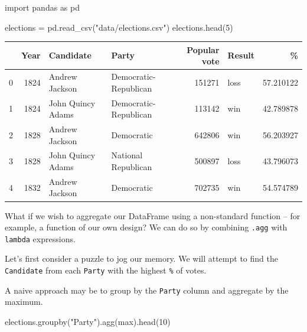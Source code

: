 \documentclass[
  letterpaper,
  DIV=11,
  numbers=noendperiod]{scrreprt}
\newenvironment{Shaded}{\begin{snugshade}}{\end{snugshade}}
\newcommand{\BuiltInTok}[1]{\textcolor[rgb]{0.00,0.23,0.31}{#1}}
\newcommand{\DecValTok}[1]{\textcolor[rgb]{0.68,0.00,0.00}{#1}}
\newcommand{\ImportTok}[1]{\textcolor[rgb]{0.00,0.46,0.62}{#1}}
\newcommand{\NormalTok}[1]{\textcolor[rgb]{0.00,0.23,0.31}{#1}}
\newcommand{\OperatorTok}[1]{\textcolor[rgb]{0.37,0.37,0.37}{#1}}
\newcommand{\StringTok}[1]{\textcolor[rgb]{0.13,0.47,0.30}{#1}}
\begin{document}
\begin{Shaded}
\begin{Highlighting}[]
\ImportTok{import}\NormalTok{ pandas }\ImportTok{as}\NormalTok{ pd}

\NormalTok{elections }\OperatorTok{=}\NormalTok{ pd.read\_csv(}\StringTok{"data/elections.csv"}\NormalTok{)}
\NormalTok{elections.head(}\DecValTok{5}\NormalTok{)}
\end{Highlighting}
\end{Shaded}

\begin{tabular}{lrllrlr}
\toprule
{} &  Year &          Candidate &                  Party &  Popular vote & Result &          \% \\
\midrule
0 &  1824 &     Andrew Jackson &  Democratic-Republican &        151271 &   loss &  57.210122 \\
1 &  1824 &  John Quincy Adams &  Democratic-Republican &        113142 &    win &  42.789878 \\
2 &  1828 &     Andrew Jackson &             Democratic &        642806 &    win &  56.203927 \\
3 &  1828 &  John Quincy Adams &    National Republican &        500897 &   loss &  43.796073 \\
4 &  1832 &     Andrew Jackson &             Democratic &        702735 &    win &  54.574789 \\
\bottomrule
\end{tabular}

What if we wish to aggregate our DataFrame using a non-standard function
-- for example, a function of our own design? We can do so by combining
\texttt{.agg} with \texttt{lambda} expressions.

Let's first consider a puzzle to jog our memory. We will attempt to find
the \texttt{Candidate} from each \texttt{Party} with the highest
\texttt{\%} of votes.

A naive approach may be to group by the \texttt{Party} column and
aggregate by the maximum.

\begin{Shaded}
\begin{Highlighting}[]
\NormalTok{elections.groupby(}\StringTok{"Party"}\NormalTok{).agg(}\BuiltInTok{max}\NormalTok{).head(}\DecValTok{10}\NormalTok{)}
\end{Highlighting}
\end{Shaded}
\end{document}
